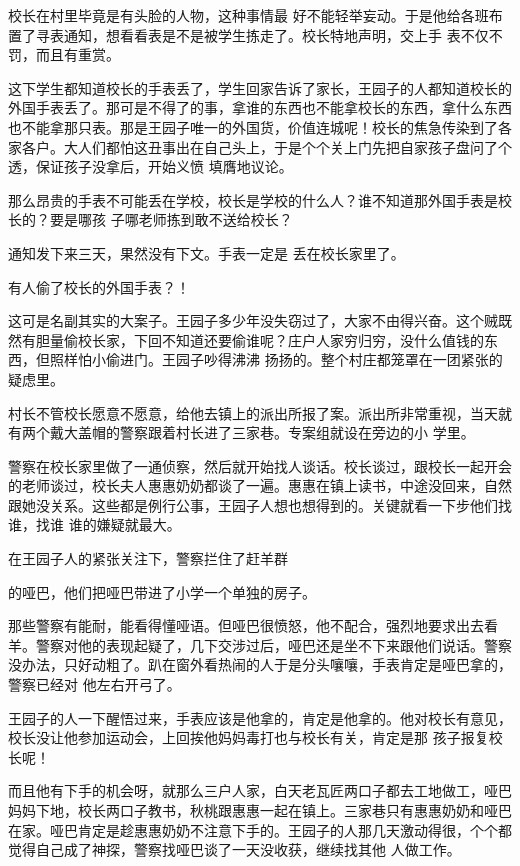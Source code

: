 \documentclass{article}
\begin{document}
校长在村里毕竟是有头脸的人物，这种事情最
\newpage
好不能轻举妄动。于是他给各班布置了寻表通知，想看看表是不是被学生拣走了。校长特地声明，交上手
表不仅不罚，而且有重赏。 

这下学生都知道校长的手表丢了，学生回家告诉了家长，王园子的人都知道校长的外国手表丢了。那可是不得了的事，拿谁的东西也不能拿校长的东西，拿什么东西也不能拿那只表。那是王园子唯一的外国货，价值连城呢！校长的焦急传染到了各家各户。大人们都怕这丑事出在自己头上，于是个个关上门先把自家孩子盘问了个透，保证孩子没拿后，开始义愤
填膺地议论。 

那么昂贵的手表不可能丢在学校，校长是学校的什么人？谁不知道那外国手表是校长的？要是哪孩
子哪老师拣到敢不送给校长？ 

通知发下来三天，果然没有下文。手表一定是
丢在校长家里了。 


\newpage

有人偷了校长的外国手表？！ 

这可是名副其实的大案子。王园子多少年没失窃过了，大家不由得兴奋。这个贼既然有胆量偷校长家，下回不知道还要偷谁呢？庄户人家穷归穷，没什么值钱的东西，但照样怕小偷进门。王园子吵得沸沸
扬扬的。整个村庄都笼罩在一团紧张的疑虑里。 

村长不管校长愿意不愿意，给他去镇上的派出所报了案。派出所非常重视，当天就有两个戴大盖帽的警察跟着村长进了三家巷。专案组就设在旁边的小
学里。 

警察在校长家里做了一通侦察，然后就开始找人谈话。校长谈过，跟校长一起开会的老师谈过，校长夫人惠惠奶奶都谈了一遍。惠惠在镇上读书，中途没回来，自然跟她没关系。这些都是例行公事，王园子人想也想得到的。关键就看一下步他们找谁，找谁
谁的嫌疑就最大。 

在王园子人的紧张关注下，警察拦住了赶羊群

\newpage
的哑巴，他们把哑巴带进了小学一个单独的房子。 

那些警察有能耐，能看得懂哑语。但哑巴很愤怒，他不配合，强烈地要求出去看羊。警察对他的表现起疑了，几下交涉过后，哑巴还是坐不下来跟他们说话。警察没办法，只好动粗了。趴在窗外看热闹的人于是分头嚷嚷，手表肯定是哑巴拿的，警察已经对
他左右开弓了。 

王园子的人一下醒悟过来，手表应该是他拿的，肯定是他拿的。他对校长有意见，校长没让他参加运动会，上回挨他妈妈毒打也与校长有关，肯定是那
孩子报复校长呢！ 

而且他有下手的机会呀，就那么三户人家，白天老瓦匠两口子都去工地做工，哑巴妈妈下地，校长两口子教书，秋桃跟惠惠一起在镇上。三家巷只有惠惠奶奶和哑巴在家。哑巴肯定是趁惠惠奶奶不注意下手的。王园子的人那几天激动得很，个个都觉得自己成了神探，警察找哑巴谈了一天没收获，继续找其他
人做工作。 
\end{document}
